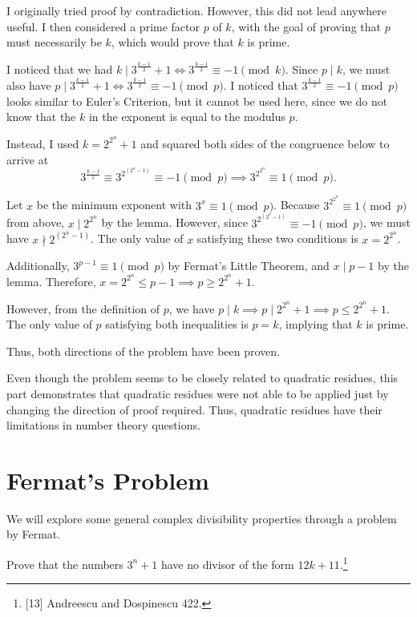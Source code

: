 \documentclass{article}
\begin{document}
I originally tried proof by contradiction. However, this did not lead anywhere useful. I then considered a prime factor $p$ of $k$, with the goal of proving that $p$ must necessarily be $k$, which would prove that $k$ is prime.

I noticed that we had $k \mid 3^{\frac{k-1}{2}}+1 \iff 3^{\frac{k-1}{2}} \equiv -1 \pmod k$. Since $p \mid k$, we must also have $p \mid 3^{\frac{k-1}{2}}+1 \iff 3^{\frac{k-1}{2}} \equiv -1 \pmod p$. I noticed that $3^{\frac{k-1}{2}} 
\equiv -1 \pmod p$ looks similar to Euler's Criterion, but it cannot be used here, since we do not know that the $k$ in the exponent is equal to the modulus $p$.

Instead, I used $k = 2^{2^{n}}+1$ and squared both sides of the congruence below to arrive at
\[3^{\frac{k-1}{2}} 
\equiv 3^{2^{(2^n-1)}} \equiv -1 \pmod p \implies 3^{2^{2^n}} \equiv 1 \pmod p.\]

Let $x$ be the minimum exponent with $3^x \equiv 1 \pmod p$. Because $3^{2^{2^{n}}} \equiv 1 \pmod p$ from above, $x \mid 2^{2^{n}}$ by the lemma. However, since $3^{2^{(2^{n}-1)}} \equiv -1 \pmod p$, we must have $x \nmid 2^{(2^n-1)}$. The only value of $x$ satisfying these two conditions is $x = 2^{2^n}$.

Additionally, $3^{p-1} \equiv 1 \pmod p$ by Fermat's Little Theorem, and $x \mid p-1$ by the lemma. Therefore, $x =  2^{2^{n}} \le p-1 \implies p \ge 2^{2^n}+1$. 

However, from the definition of $p$, we have $p \mid k \implies p \mid 2^{2^n}+1 \implies p \le 2^{2^n}+1$. The only value of $p$ satisfying both inequalities is $p=k$, implying that $k$ is prime.

Thus, both directions of the problem have been proven. \qedsymbol

Even though the problem seems to be closely related to quadratic residues, this part demonstrates that quadratic residues were not able to be applied just by changing the direction of proof required. Thus, quadratic residues have their limitations in number theory questions.
\newpage
\section{Fermat's Problem}
We will explore some general complex divisibility properties through a problem by Fermat.
\begin{center}
     Prove that the numbers $3^n + 1$ have no divisor of the form $12k + 11$.\footnote{[13] Andreescu and Dospinescu 422.}
\end{center}
\end{document}
